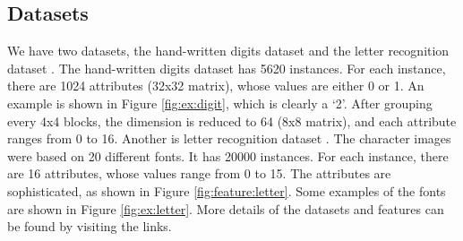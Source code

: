 \documentclass[11pt]{article}
\begin{document}
\subsection{Datasets}
We have two datasets, the hand-written digits dataset \cite{digitdataset} and the letter recognition dataset \cite{letterdataset}. The hand-written digits dataset has 5620 instances. For each instance, there are 1024 attributes (32x32 matrix), whose values are either 0 or 1. An example is shown in Figure \ref{fig:ex:digit}, which is clearly a `2'. After grouping every 4x4 blocks, the dimension is reduced to 64 (8x8 matrix), and each attribute ranges from 0 to 16. Another is letter recognition dataset \cite{letterdataset}. The character images were based on 20 different fonts. It has 20000 instances. For each instance, there are 16 attributes, whose values range from 0 to 15. The attributes are sophisticated, as shown in Figure \ref{fig:feature:letter}. Some examples of the fonts are shown in Figure \ref{fig:ex:letter}. More details of the datasets and features can be found by visiting the links.
\end{document}
